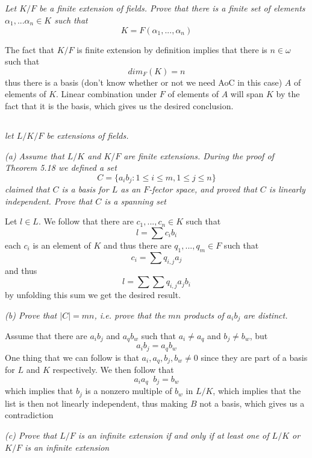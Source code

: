 \documentclass[11pt,oneside,titlepage]{book}
\DeclareMathOperator \inv {^{-1}}
\newcommand{\set}[1]{\{ #1 \}}
\begin{document}
\subsection{}

\textit{Let $K/F$ be a finite extension of fields. Prove that there is
a finite set of elements $\alpha_1, ... \alpha_n \in K$ such that
  $$K = F(\alpha_1, ..., \alpha_n)$$
}

The fact that $K/F$ is finite extension by definition implies that
there is $n \in \omega$ such that
$$dim_F(K) = n$$
thus there is a basis (don't know whether or not we need AoC in this
case) $A$ of elements of $K$. Linear combination under $F$ of elements
of $A$ will span $K$ by the fact that it is the basis, which gives us
the desired conclusion.

\subsection{}

\textit{let $L/K/F$ be extensions of fields.}

\textit{(a) Assume that $L/K$ and $K/F$ are finite extensions. During
the proof of Theorem 5.18 we defined a set
  $$C = \set{a_i b_j: 1 \leq i \leq m, 1 \leq j \leq n}$$
  claimed that $C$ is a basis for $L$ as an $F$-fector space, and
proved that $C$ is linearly independent. Prove that $C$ is a spanning
set}

Let $l \in L$. We follow that there are $c_1, ..., c_n \in K$ such
that
$$l = \sum{c_i b_i}$$
each $c_i$ is an element of $K$ and thus there are $q_1, ..., q_m \in
F$ such that
$$c_i = \sum{q_{i, j} a_j}$$
and thus
$$l = \sum{\sum{q_{i, j} a_j} b_i}$$
by unfolding this sum we get the desired result.

\textit{(b) Prove that $|C| = mn$, i.e. prove that the $mn$ products
of $a_i b_j$ are distinct.}

Assume that there are $a_i b_j$ and $a_q b_w$ such that $a_i \neq a_q$
and $b_j \neq b_w$, but
$$a_i b_j = a_q b_w$$
One thing that we can follow is that $a_i, a_q, b_j, b_w \neq 0$ since
they are part of a basis for $L$ and $K$ respectively.  We then follow
that
$$a_i a_q \inv b_j = b_w$$
which implies that $b_j$ is a nonzero multiple of $b_w$ in $L/K$,
which implies that the list is then not linearly independent, thus
making $B$ not a basis, which gives us a contradiction

\textit{(c) Prove that $L/F$ is an infinite extension if and only if
at least one of $L/K$ or $K/F$ is an infinite extension}
\end{document}
